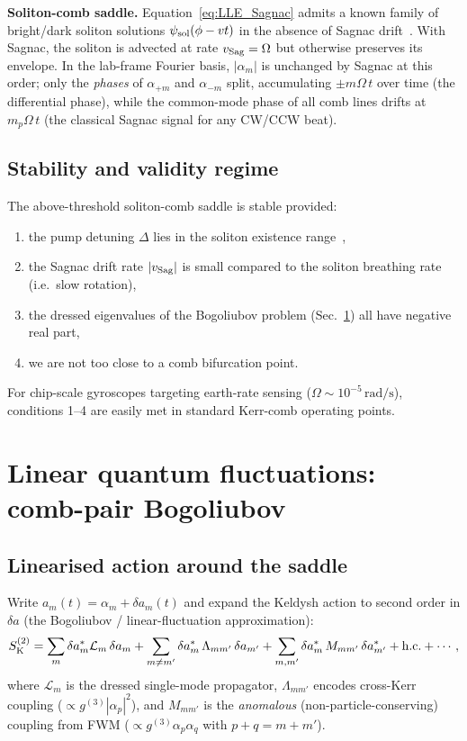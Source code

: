 \documentclass[11pt]{article}
\newcommand{\K}{{\rm K}}
\newcommand{\Sag}{{\rm Sag}}
\begin{document}
\textbf{Soliton-comb saddle.}  Equation~\eqref{eq:LLE_Sagnac} admits a
known family of bright/dark soliton solutions $\psi_{\rm sol}(\phi - vt)$
in the absence of Sagnac drift~\cite{LugiatoLefever1987,Herr2014}.  With
Sagnac, the soliton is advected at rate $v_\Sag = \Omega$ but otherwise
preserves its envelope.  In the lab-frame Fourier basis, $|\alpha_m|$ is
unchanged by Sagnac at this order; only the \emph{phases} of $\alpha_{+m}$
and $\alpha_{-m}$ split, accumulating $\pm m\Omega\,t$ over time (the
differential phase), while the common-mode phase of all comb lines drifts
at $m_p\Omega\,t$ (the classical Sagnac signal for any CW/CCW beat).

\subsection{Stability and validity regime}

The above-threshold soliton-comb saddle is stable provided:
\begin{enumerate}\itemsep0em
  \item the pump detuning $\Delta$ lies in the soliton existence
    range~\cite{Herr2014},
  \item the Sagnac drift rate $|v_\Sag|$ is small compared to the
    soliton breathing rate (i.e.\ slow rotation),
  \item the dressed eigenvalues of the Bogoliubov problem
    (Sec.~\ref{sec:bogo}) all have negative real part,
  \item we are not too close to a comb bifurcation point.
\end{enumerate}
For chip-scale gyroscopes targeting earth-rate sensing
($\Omega\sim 10^{-5}\,\mathrm{rad/s}$), conditions 1--4 are easily
met in standard Kerr-comb operating points.

\section{Linear quantum fluctuations: comb-pair Bogoliubov}
\label{sec:bogo}

\subsection{Linearised action around the saddle}

Write $a_m(t) = \alpha_m + \delta a_m(t)$ and expand the Keldysh action
to second order in $\delta a$ (the Bogoliubov / linear-fluctuation
approximation):
\begin{equation}
  S^{(2)}_\K = \sum_m \delta a^{*}_m \mathcal{L}_m\,\delta a_m
  + \sum_{m\neq m'} \delta a^{*}_m\,\Lambda_{mm'}\,\delta a_{m'}
  + \sum_{m,m'}\delta a^{*}_m\,M_{mm'}\,\delta a^{*}_{m'} + \mathrm{h.c.}
  + \cdots,
\end{equation}
where $\mathcal{L}_m$ is the dressed single-mode propagator,
$\Lambda_{mm'}$ encodes cross-Kerr coupling
($\propto g^{(3)}|\alpha_p|^2$), and $M_{mm'}$ is the
\emph{anomalous} (non-particle-conserving) coupling from FWM
($\propto g^{(3)}\alpha_p\alpha_q$ with $p+q = m+m'$).
\end{document}
